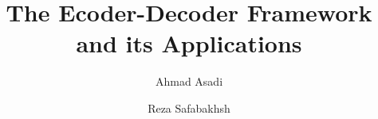 \documentclass[preprint, 12pt]{elsarticle}
\begin{document}
	\begin{frontmatter}
		
		
		\author{Ahmad Asadi}
		\author{Reza Safabakhsh}
		\address{Department of Computer Engineering and Information Technology, Amirkabir University of Technology}
		
		\title{The Ecoder-Decoder Framework and its Applications}
		
		
		\author{}
		
		\address{}
		
		\begin{abstract}


\end{abstract}
\end{frontmatter}
\end{document}
